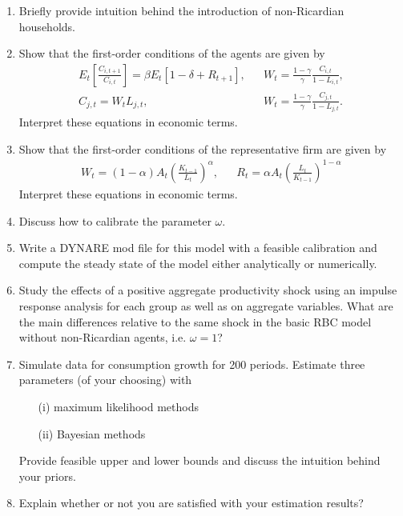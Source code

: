 \begin{enumerate}
    \item Briefly provide intuition behind the introduction of non-Ricardian households.
    \item Show that the first-order conditions of the agents are given by
          \begin{align*}
              E_t\left[\frac{C_{i,t+1}}{C_{i,t}}\right] = \beta E_t\left[1-\delta + R_{t+1}\right], &  &
              W_t = \frac{1-\gamma}{\gamma} \frac{C_{i,t}}{1-L_{i,t}},                                   \\
              C_{j,t} = W_t L_{j,t},                                                                &  &
              W_t = \frac{1-\gamma}{\gamma} \frac{C_{j,t}}{1-L_{j,t}}.
          \end{align*}
          Interpret these equations in economic terms.

    \item Show that the first-order conditions of the representative firm are given by
          \begin{align*}
              W_t = (1-\alpha) A_t \left(\frac{K_{t-1}}{L_t}\right)^\alpha, &  & R_t = \alpha A_t \left(\frac{L_t}{K_{t-1}}\right)^{1-\alpha}
          \end{align*}
          Interpret these equations in economic terms.
    \item Discuss how to calibrate the parameter $\omega$.
    \item Write a DYNARE mod file for this model with a feasible calibration and compute the steady state of the model either analytically or numerically.
    \item Study the effects of a positive aggregate productivity shock using an impulse response analysis for each group as well as on aggregate variables. What are the main differences relative to the same shock in the basic RBC model without non-Ricardian agents, i.e. $\omega=1$?
    \item Simulate data for consumption growth for 200 periods. Estimate three parameters (of your choosing) with
          \begin{itemize}
              \item[(i)] maximum likelihood methods
              \item[(ii)] Bayesian methods
          \end{itemize}
          Provide feasible upper and lower bounds and discuss the intuition behind your priors.
    \item Explain whether or not you are satisfied with your estimation results?
\end{enumerate}